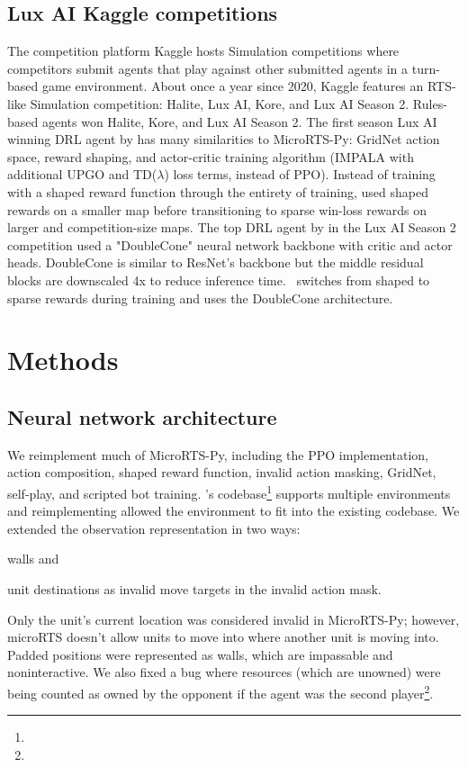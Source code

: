 \documentclass{article}
\begin{document}
\subsection{Lux AI Kaggle competitions}
The competition platform Kaggle hosts Simulation competitions where competitors
submit agents that play against other submitted agents in a turn-based game
environment. About once a year since 2020, Kaggle features an RTS-like Simulation competition:
Halite, Lux AI, Kore, and Lux AI Season 2. Rules-based agents won Halite, Kore, and Lux
AI Season 2. The first season Lux AI winning DRL agent by \citet{lux-ai-2021-winner} 
has many similarities to MicroRTS-Py: GridNet action space, reward shaping, and
actor-critic training algorithm (IMPALA with additional UPGO and TD($\lambda$) loss
terms, instead of PPO). Instead
of training with a shaped reward function through the entirety of training, \citet{lux-ai-2021-winner}
used shaped rewards on a smaller map before transitioning to sparse win-loss rewards on
larger and competition-size maps. The top DRL agent by \citet{Ferdinand2021doublecone} in the Lux AI Season 2 competition used a "DoubleCone" neural
network backbone with critic and actor heads. DoubleCone is similar to ResNet's backbone but the 
middle residual blocks are downscaled 4x to reduce inference time.
\agentName\ switches from shaped to sparse rewards during training and uses the DoubleCone architecture.


\section{Methods}
\label{sec:methods}
\subsection{Neural network architecture}
We reimplement much of MicroRTS-Py, including the PPO implementation, action
composition, shaped reward function, invalid action masking, GridNet, self-play, and
scripted bot training. \agentName's codebase\footnote{\rlAlgoImplsGitHubUrl} supports 
multiple environments and reimplementing allowed the environment to fit into the 
existing codebase. We extended the observation representation in two ways:
\begin{inparaenum}[(1)]
    \item walls and
    \item unit destinations as invalid move targets in the invalid action mask.
\end{inparaenum}
Only the unit's current location was considered invalid in MicroRTS-Py; however, 
microRTS doesn't allow units to move into where another unit is moving into.
Padded positions were represented as walls, which are impassable and noninteractive. 
We also fixed a bug where resources (which are unowned) were being counted as
owned by the opponent if the agent was the second
player\footnote{\unownedFixGitHubCommit}.
\end{document}
